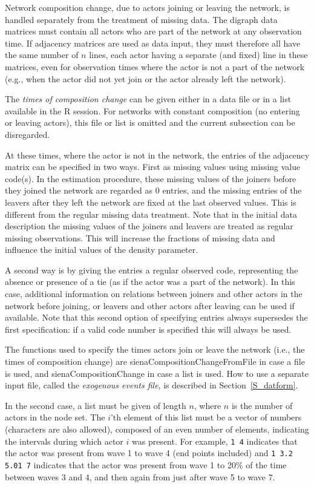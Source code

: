 \documentclass[a4paper,fleqn,11pt]{article}
\newcommand{\+}{\, + \,}
\newcommand{\sfn}[1]{\textsf{#1}}
\newcommand{\R}{{\sf R }}
\begin{document}
{Network composition change, due to actors joining or leaving the
network, is handled separately from the treatment of missing data.
The digraph data matrices must contain all actors who are part of the
network at any observation time.
If adjacency matrices are used as data input, they must therefore
all have the same number of $n$ lines, each actor
having a separate (and fixed) line in these matrices, even for
observation times where the actor is not a part of the network
(e.g., when the actor did not yet join or the actor already left
the network).

The \emph{times of composition change} can be given
either in a data file or in a list available in the \R session.
For networks with constant composition
(no entering or leaving actors), this file or list is
omitted and the current subsection can be disregarded.

At these times, where the actor is not in the network, the entries
of the adjacency matrix can be specified in two ways. First as
missing values using missing value code(s). In the estimation
procedure, these missing values of the joiners before they joined
the network are regarded as 0 entries, and the missing entries of
the leavers after they left the network are fixed at the last
observed values. This is different from the regular missing data
treatment. Note that in the initial data description the missing
values of the joiners and leavers are treated as regular missing
observations. This will increase the fractions of missing data and
influence the initial values of the density parameter.

A second way is by giving the entries a regular observed code,
representing the absence or presence of a tie (as
if the actor was a part of the network). In this case, additional
information on relations between joiners and other actors in the
network before joining, or leavers and other actors after leaving
can be used if available. Note that this second option of
specifying entries always supersedes the first specification: if a
valid code number is specified this will always be used.

The functions used to specify the times actors
join or leave the network (i.e., the times of composition change)
are \sfn{sienaCompositionChangeFromFile} in case a file is used,
and \sfn{sienaCompositionChange} in case a list is used.
How to use a separate input file,
called the \emph{exogenous events file}, is
described in Section~\ref{S_datform}.

In the second case, a list must be given of length $n$,
where $n$ is the number of actors in the node set.
The $i$'th element of this list must be a vector of numbers (characters are also allowed),
composed of an even number of elements, indicating the intervals during
which actor $i$ was present. For example, \texttt{1 4} indicates that the actor
was present from wave 1 to wave 4 (end points included) and
\texttt{1 3.2 5.01 7}
indicates that the actor was present from wave 1 to 20\% of the time between
waves 3 and 4, and then again from just after wave 5 to wave 7.

}
\end{document}
